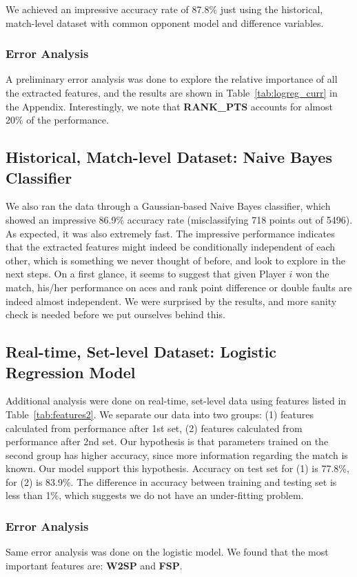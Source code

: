 \documentclass[paper=a4, fontsize=11pt]{scrartcl} %
\numberwithin{equation}{section} %
\numberwithin{figure}{section} %
\numberwithin{table}{section} %
\begin{document}
We achieved an impressive accuracy rate of 87.8\% just using the historical, match-level dataset with common opponent model and difference variables. 
\subsubsection{Error Analysis}
A preliminary error analysis was done to explore the relative importance of all the extracted features, and the results are shown in Table~\ref{tab:logreg_curr} in the Appendix. Interestingly, we note that \textbf{RANK\_PTS} accounts for almost $20\%$ of the performance. 
\subsection{Historical, Match-level Dataset: Naive Bayes Classifier}
We also ran the data through a Gaussian-based Naive Bayes classifier, which showed an impressive 86.9\% accuracy rate (misclassifying 718 points out of 5496). As expected, it was also extremely fast. The impressive performance indicates that the extracted features might indeed be conditionally independent of each other, which is something we never thought of before, and look to explore in the next steps. On a first glance, it seems to suggest that given Player $i$ won the match, his/her performance on aces and rank point difference or double faults are indeed almost independent. We were surprised by the results, and more sanity check is needed before we put ourselves behind this. 
\subsection{Real-time, Set-level Dataset: Logistic Regression Model}
Additional analysis were done on real-time, set-level data using features listed in Table~\ref{tab:features2}. We separate our data into two groups: (1) features calculated from performance after 1st set, (2) features calculated from performance after 2nd set.  Our hypothesis is that parameters trained on the second group has higher accuracy, since more information regarding the match is known.  Our model support this hypothesis.  Accuracy on test set for (1) is 77.8\%, for (2) is 83.9\%.  The difference in accuracy between training and testing set is less than 1\%, which suggests we do not have an under-fitting problem.
\subsubsection{Error Analysis}
Same error analysis was done on the logistic model.  We found that the most important features are: \textbf{W2SP} and \textbf{FSP}.
\end{document}
